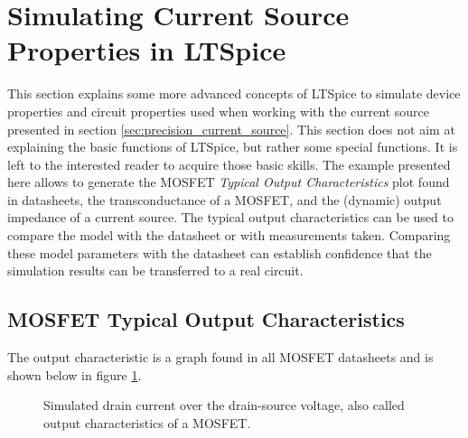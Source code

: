 \documentclass[12pt]{book}
\begin{document}
\section{Simulating Current Source Properties in LTSpice}
\label{sec:ltspice_current_source}
This section explains some more advanced concepts of LTSpice \cite{ltspice} to simulate device properties and circuit properties used when working with the current source presented in section \ref{sec:precision_current_source}. This section does not aim at explaining the basic functions of LTSpice, but rather some special functions. It is left to the interested reader to acquire those basic skills. The example presented here allows to generate the MOSFET \textit{Typical Output Characteristics} plot found in datasheets, the transconductance of a MOSFET, and the (dynamic) output impedance of a current source. The typical output characteristics can be used to compare the model with the datasheet or with measurements taken. Comparing these model parameters with the datasheet can establish confidence that the simulation results can be transferred to a real circuit.

\subsection{MOSFET Typical Output Characteristics}
The output characteristic is a graph found in all MOSFET datasheets and is shown below in figure \ref{fig:ltspice_mosfet_drain_current_example}.
\begin{figure}[hb]
    \centering
    
    \caption{Simulated drain current over the drain-source voltage, also called output characteristics of a MOSFET.}
    \label{fig:ltspice_mosfet_drain_current_example}
\end{figure}
\end{document}
